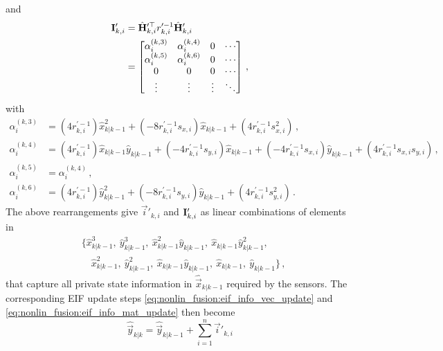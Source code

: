 and
\begin{equation}\label{eq:nonlin_fusion:hrh_linear_comb}
    \begin{split}
        {\ensuremath{{\mathbf{I}}}}'_{k,i} &= \hat{{{\mathbf{H}}}}_{k,i}^{\prime\top} r_{k,i}^{\prime-1}\hat{{{\mathbf{H}}}}'_{k,i} \\
        &=
        \begin{bmatrix}
            \alpha_i^{(k,3)} & \alpha_i^{(k,4)} & 0 & \cdots \\
            \alpha_i^{(k,5)} & \alpha_i^{(k,6)} & 0 & \cdots\\
            0 & 0 & 0 & \cdots \\
            \vdots & \vdots & \vdots & \ddots
        \end{bmatrix}\,,
    \end{split}
\end{equation}
with
\begin{align*}
    \alpha_i^{(k,3)} &= (4r_{k,i}^{\prime-1})\hat{x}_{k|k-1}^2 + (-8r_{k,i}^{\prime-1}s_{x,i})\hat{x}_{k|k-1} + (4r_{k,i}^{\prime-1}s_{x,i}^2)\,,\\
    \alpha_i^{(k,4)} &= (4r_{k,i}^{\prime-1})\hat{x}_{k|k-1}\hat{y}_{k|k-1} + (-4r_{k,i}^{\prime-1}s_{y,i})\hat{x}_{k|k-1} + (-4r_{k,i}^{\prime-1}s_{x,i})\hat{y}_{k|k-1} + (4r_{k,i}^{\prime-1}s_{x,i}s_{y,i})\,,\\
    \alpha_i^{(k,5)} &= \alpha_i^{(k,4)}\,,\\
    \alpha_i^{(k,6)} &= (4r_{k,i}^{\prime-1})\hat{y}_{k|k-1}^2 + (-8r_{k,i}^{\prime-1}s_{y,i})\hat{y}_{k|k-1} + (4r_{k,i}^{\prime-1}s_{y,i}^2)\,.
\end{align*}
The above rearrangements give $\vec{i}'_{k,i}$ and ${{\mathbf{I}}}'_{k,i}$ as linear combinations of elements in
\begin{equation}\label{eq:nonlin_fusion:weights_to_broadcast}
    \begin{split}
        &\{ \hat{x}_{k|k-1}^3,\ \hat{y}_{k|k-1}^3,\ \hat{x}_{k|k-1}^2\hat{y}_{k|k-1},\ \hat{x}_{k|k-1}\hat{y}_{k|k-1}^2,\\
        &\quad \hat{x}_{k|k-1}^2,\ \hat{y}_{k|k-1}^2,\ \hat{x}_{k|k-1}\hat{y}_{k|k-1},\ \hat{x}_{k|k-1},\ \hat{y}_{k|k-1}\}\,,
    \end{split}
\end{equation}
that capture all private state information in $\hat{\vec{x}}_{k|k-1}$ required by the sensors. The corresponding EIF update steps \eqref{eq:nonlin_fusion:eif_info_vec_update} and \eqref{eq:nonlin_fusion:eif_info_mat_update} then become
\begin{equation}\label{eq:nonlin_fusion:eif_modified_vec_update}
    \hat{\vec{y}}_{k|k} = \hat{\vec{y}}_{k|k-1} + \sum^n_{i=1}\vec{i}'_{k,i}
\end{equation}
